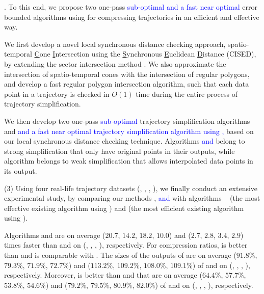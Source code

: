 .
To this end, we propose two one-pass \textcolor{blue}{sub-optimal and a fast near optimal} error bounded \lsa algorithms using \sed for compressing trajectories in an efficient and effective way. %

 We first develop a novel local synchronous distance checking approach, \ie spatio-temporal \underline{C}one \underline{I}ntersection using the \underline{S}ynchronous \underline{E}uclidean \underline{D}istance (CISED), by extending the sector intersection method \cite{Williams:Longest, Sklansky:Cone, Zhao:Sleeve}. We also approximate the intersection of spatio-temporal cones with the intersection of regular polygons, and develop a fast regular polygon intersection algorithm, such that each data point in a trajectory is checked in $O(1)$ time during the entire process of trajectory simplification.

 We then develop two one-pass \textcolor{blue}{sub-optimal} trajectory simplification algorithms \cist and \cista \textcolor{blue}{and a fast near optimal trajectory simplification algorithm \cisto using \sed,} based on our local synchronous distance checking technique. 
Algorithms \cist\textcolor{blue}{and \cisto} belong to strong simplification that only have original points in their outputs, while algorithm \cista belongs to weak simplification that allows interpolated data points in its output.


\sstab (3) Using four real-life trajectory datasets (\truck, \sercar, \geolife, \pricar),
we finally conduct an extensive experimental study, by comparing our methods \cist, \cista \textcolor{blue}{and \cisto} with algorithms \dps~\cite{Meratnia:Spatiotemporal} (the most effective existing \lsa algorithm using \sed) and \squishe \cite{Muckell:Compression} (the most efficient existing \lsa algorithm using \sed).

Algorithms \cist and \cista are on average ($20.7$, $14.2$, $18.2$, $10.0$) and ($2.7$, $2.8$, $3.4$, {$2.9$}) times faster than \dps and \squishe on (\truck, \sercar, \geolife, \pricar), respectively.
%
For compression ratios, \cist is better than \squishe and is comparable with \dps. The sizes of the outputs of \cist are on average ($91.8\%$, $79.3\%$, $71.9\%$, {$72.7\%$}) and ($113.2\%$, $109.2\%$, $108.0\%$, $109.1\%$) of \squishe and \dps on (\truck, \sercar, \geolife, \pricar), respectively. Moreover, \cista is better than \squishe and \dps that are on average ($64.4\%$, $57.7\%$, $53.8\%$, {$54.6\%$}) and ($79.2\%$, $79.5\%$, $80.9\%$, $82.0\%$) of \squishe and \dps on (\truck, \sercar, \geolife, \pricar), respectively.


